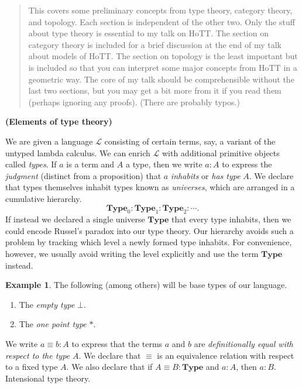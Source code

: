 \documentclass[10pt,letterpaper,cm]{nupset}
\theoremstyle{definition}
\newtheorem{exmp}{Example}
\newcommand{\1}{\mathbf{1}}
\newcommand{\0}{\vec 0}
\begin{document}
\begin{abstract}
This covers some preliminary concepts from type theory, category theory, and topology. Each section is independent of the other two. Only the stuff about type theory is essential to my talk on HoTT. The section on category theory is included for a brief discussion at the end of my talk about models of HoTT.  The section on topology is the least important but is included so that you can interpret some major concepts from HoTT in a geometric way. The core of my talk should be comprehensible without the last two sections, but you may get a bit more from it if you read them (perhaps ignoring any proofs). (There are probably typos.)
\end{abstract}

\begin{center}
{\textbf{(Elements of type theory)}} 
\end{center}

We are given a language $\mathcal{L}$ consisting of certain terms, say, a variant of the untyped lambda calculus. We can enrich $\mathcal{L}$ with additional primitive objects called \textit{types}. If $a$ is a term and $A$ a type, then we write $a: A$ to express the \textit{judgment} (distinct from a proposition) that $a$ \textit{inhabits} or \textit{has type} $A$. We declare that types themselves inhabit types known as \textit{universes}, which are arranged in a cumulative hierarchy. $$\mathbf{Type}_0 :\mathbf{Type}_1 : \mathbf{Type}_2 : \cdots . $$ If instead we declared a single universe $\mathbf{Type}$ that every type inhabits, then we could encode Russel's paradox into our type theory. Our hierarchy avoids such a problem by tracking which level a newly formed type inhabits. For convenience, however, we usually avoid writing the level explicitly and use the term $\mathbf{Type}$ instead.
\begin{exmp} The following (among others) will be base types of our language.
\begin{enumerate}
\item The \textit{empty type} $\bot$.
\item The \textit{one point type} $\ast$.
\end{enumerate}
\end{exmp}
We write $a\equiv b :A$ to express that the terms $a$ and $b$ are \textit{definitionally equal with respect to the type $A$}. We declare that $\equiv$ is an equivalence relation with respect to a fixed type $A$. We also declare that if $A\equiv B : \mathbf{Type}$ and $a: A$, then $a:B$. Intensional type theory.
\end{document}
